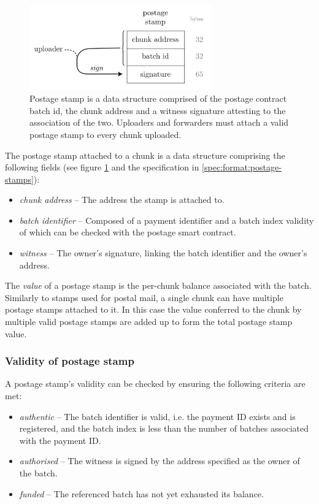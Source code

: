 \begin{figure}[htbp]
  \centering
    \includegraphics[width=0.7\textwidth]{fig/postage-stamp-structure.pdf}
  \caption[Postage stamp \statusgreen]{Postage stamp is a data structure comprised of the postage contract batch id, the chunk address and a witness signature attesting to the association of the two. Uploaders and forwarders must attach a valid postage stamp to every chunk uploaded. }
  \label{fig:postage-stamp}
\end{figure}


The postage stamp attached to a chunk is a data structure comprising the following fields (see figure  \ref{fig:postage-stamp}  and the specification in \ref{spec:format:postage-stamps}):

\begin{itemize}
    \item \emph{chunk address} -- The address the stamp is attached to. 
    \item \emph{batch identifier} -- Composed of a payment identifier and a batch index validity of which can be checked with the postage smart contract.
    \item \emph{witness} -- The owner's signature, linking the batch identifier and the owner's address.
\end{itemize}

The \emph{value} of a postage stamp is the per-chunk balance associated with the batch.
Similarly to stamps used for postal mail, a single chunk can have multiple postage stamps attached to it. In this case the value conferred to the chunk by multiple valid postage stamps are added up to form the total postage stamp value. 

\subsubsection{Validity of postage stamp}

A postage stamp's validity can be checked by ensuring the following criteria are met:

\begin{itemize}
\item \emph{authentic} -- The batch identifier is valid, i.e. the payment ID exists and is registered, and the batch index is less than the number of batches associated with the payment ID.
\item \emph{authorised} -- The witness is signed by the address specified as the owner of the batch.
\item \emph{funded} -- The referenced batch has not yet exhausted its balance. 
\end{itemize}

